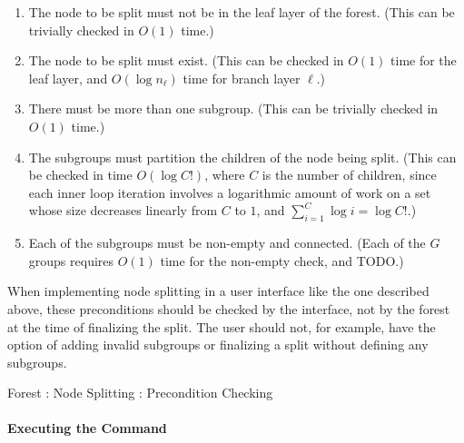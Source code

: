 \begin{enumerate}

\item The node to be split must not be in the leaf layer of the forest. (This can be trivially checked in $O(1)$ time.)
\item The node to be split must exist. (This can be checked in $O(1)$ time for the leaf layer, and $O(\log n_\ell)$ time for branch layer $\ell$.)
\item There must be more than one subgroup. (This can be trivially checked in $O(1)$ time.)
\item The subgroups must partition the children of the node being split. (This can be checked in time $O(\log C!)$, where $C$ is the number of children, since each inner loop iteration involves a logarithmic amount of work on a set whose size decreases linearly from $C$ to $1$, and $\sum_{i=1}^C \log i = \log C!$.)
\item Each of the subgroups must be non-empty and connected. (Each of the $G$ groups requires $O(1)$ time for the non-empty check, and TODO.)

\end{enumerate}

When implementing node splitting in a user interface like the one described above, these preconditions should be checked by the interface, not by the forest at the time of finalizing the split. The user should not, for example, have the option of adding invalid subgroups or finalizing a split without defining any subgroups.

\begin{stulisting}[p]
\caption{Forest : Node Splitting : Precondition Checking}
\label{code:ipfs-forest-splitnode}

\end{stulisting}

\paragraph{Executing the Command}

